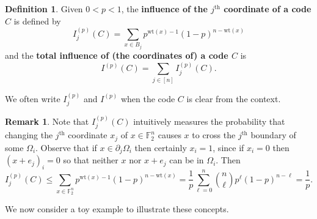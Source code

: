 \documentclass[12pt]{article}
\newcommand{\F}{\mathbb{F}}
\newcommand{\wt}{\mathrm{wt}}
\def\F{\mathbb F}
\theoremstyle{definition}
\newtheorem{definition}[theorem]{Definition}
\newtheorem{remark}[theorem]{Remark}
\begin{document}
\begin{definition}
Given $0 <p<1$, the {\bf influence of the $j^\text{th}$ coordinate of a code} $C$ is defined by
\begin{equation} \label{inf_def}
I_j^{(p)}(C) = \sum_{{x} \in B_j} p^{\wt({x}) - 1}(1-p)^{n - \wt({x})}
\end{equation} and the {\bf total influence of (the coordinates of) a code $C$} is $$I^{(p)}(C)=\sum_{j \in [n]} I_j^{(p)}(C).$$
\end{definition}
We often write $I^{(p)}_j$ and $I^{(p)}$ when the code \(C\) is clear from the context.


\begin{remark}
Note that $I_j^{(p)}(C)$
intuitively measures the probability that changing the  \(j^\text{th}\) coordinate \(x_j\) of $x\in \F_2^n$ causes \({x}\) to cross the \(j^\text{th}\) boundary of some $\Omega_i$. Observe that if \(x \in \partial_j\Omega_i\) then certainly \(x_i = 1\), since if \(x_i = 0\) then \( (x+e_j)_i = 0\) so that neither \(x\) nor \(x+e_j\) can be in \(\Omega_i\).
Then 
$$
I_j^{(p)}(C)  \leq \sum_{{x} \in \F_2^n} p^{\wt({x}) - 1}(1-p)^{n - \wt({x})} = \frac{1}{p} \sum_{\ell=0}^n \binom{n}{\ell} p^{\ell}(1-p)^{n-\ell} = \frac{1}{p}.
$$
\end{remark}

We now consider a toy example to illustrate these concepts.
 
\end{document}
